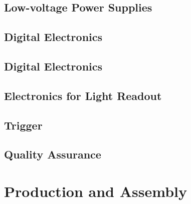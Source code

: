 \subsection{Low-voltage Power Supplies}
\label{sec:fddp-tpc-elec-design-lvps}

\subsection{Digital Electronics}
\label{sec:fddp-tpc-elec-design-utca}

\subsection{Digital Electronics}
\label{sec:fddp-tpc-elec-design-cro}




\subsection{Electronics for Light Readout}
\label{sec:fddp-tpc-elec-design-lro}


\subsection{Trigger}
\label{sec:fddp-tpc-elec-trigger}


\subsection{Quality Assurance}
\label{sec:fddp-tpc-elec-qa}




\section{Production and Assembly}
\label{sec:fddp-tpc-elec-prod-assy}

